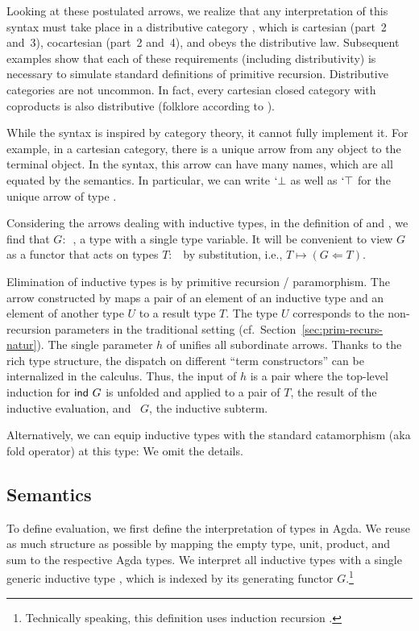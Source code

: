 \documentclass[a4paper,USenglish,cleveref, autoref, thm-restate]{lipics-v2021}
\begin{document}
Looking at these postulated arrows, we realize that any interpretation
of this syntax must take place in a distributive category
\cite{cockett_1993}, which is  cartesian (part~2 and~3), cocartesian
(part~2 and~4), and obeys the distributive law. Subsequent examples show
that each of these requirements (including distributivity) is
necessary to simulate standard definitions of primitive recursion. 
Distributive categories are not uncommon. In fact, every cartesian
closed category with coproducts is also distributive (folklore
according to \cite{https://doi.org/10.48550/arxiv.1406.0961}).

While the syntax is inspired by category theory, it cannot fully
implement it. For example, in a cartesian category, there is a unique
arrow from any object to the terminal object. In the syntax, this arrow
can have many names, which are all equated by the semantics. In
particular, we can write $`\bot$ as well as $`\top$ for the unique arrow
of type {\ccZeroOne}.

Considering the arrows dealing with inductive types, 
in the definition of {\Afold} and {\AP}, we find that $G :$~, a type with a
single type variable. It will be convenient to view $G$ as a functor
that acts on types $T:$~{\ATY} by substitution, i.e., $T \mapsto (G
\Leftarrow T)$. 

Elimination of inductive types is by primitive recursion /
paramorphism. The arrow constructed by {\AP} maps a pair of an element
of an inductive type and an element of another type $U$ to a result type
$T$. The type $U$ corresponds to the non-recursion parameters in the
traditional setting (cf.\ Section~\ref{sec:prim-recurs-natur}). 
The single parameter $h$ of {\AP} unifies all subordinate
arrows. Thanks to the rich type structure, the dispatch on different
``term constructors'' can be internalized in the calculus. Thus, the
input of $h$ is a pair where the top-level induction for $\Aind\ G$ is
unfolded and applied to a pair of $T$, the result of the inductive
evaluation, and \Aind~$G$, the inductive subterm.

Alternatively, we can equip inductive types with the standard
catamorphism (aka fold operator) at this type:
\ccDataPRF
We omit the details.

\subsection{Semantics}
\label{sec:semantics}


To define evaluation, we first define the interpretation of types in Agda.
\ccDataAlg
We reuse as much structure as possible by mapping the empty type, unit, product, and
sum to the respective Agda types. We interpret all inductive types with a
single generic inductive type , which is indexed by its generating
functor $G$.\footnote{Technically speaking, this definition uses
  induction recursion \cite{DBLP:journals/apal/DybjerS03}.}
\end{document}
